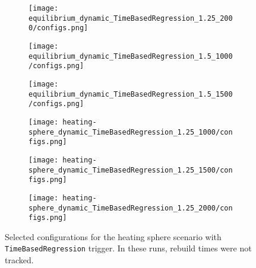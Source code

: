 \documentclass[]{article}
\begin{document}
\begin{figure}[H]
	\begin{center}
		\begin{subfigure}[b]{0.3\textwidth}
			\texttt{[image: equilibrium\_dynamic\_TimeBasedRegression\_1.25\_2000/configs.png]}
		\end{subfigure}
		\begin{subfigure}[b]{0.3\textwidth}
			\texttt{[image: equilibrium\_dynamic\_TimeBasedRegression\_1.5\_1000/configs.png]}
		\end{subfigure}
		\begin{subfigure}[b]{0.3\textwidth}
			\texttt{[image: equilibrium\_dynamic\_TimeBasedRegression\_1.5\_1500/configs.png]}
		\end{subfigure}
	\end{center}
	\begin{center}
		\begin{subfigure}[b]{0.3\textwidth}
			\texttt{[image: heating-sphere\_dynamic\_TimeBasedRegression\_1.25\_1000/configs.png]}
		\end{subfigure}
		\begin{subfigure}[b]{0.3\textwidth}
			\texttt{[image: heating-sphere\_dynamic\_TimeBasedRegression\_1.25\_1500/configs.png]}
		\end{subfigure}
		\begin{subfigure}[b]{0.3\textwidth}
			\texttt{[image: heating-sphere\_dynamic\_TimeBasedRegression\_1.25\_2000/configs.png]}
		\end{subfigure}
	\end{center}
	\caption[]{Selected configurations for the heating sphere scenario with \texttt{TimeBasedRegression} trigger. In these runs, rebuild times were not tracked.}
	\label{heat_sphere_configs_dyn_reg_no_rebuild}
\end{figure}
\end{document}
